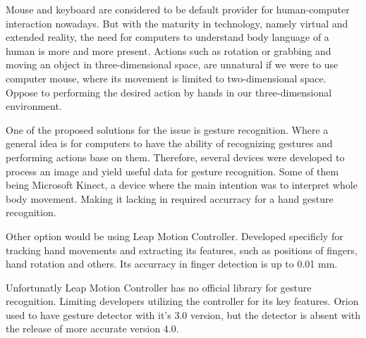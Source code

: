 Mouse and keyboard are considered to be default provider for human-computer interaction nowadays. But with the maturity in technology, namely virtual and extended reality, the need for computers to understand body language of a human is more and more present. Actions such as rotation or grabbing and moving an object in three-dimensional space, are unnatural if we were to use computer mouse, where its movement is limited to two-dimensional space. Oppose to performing the desired action by hands in our three-dimensional environment.

One of the proposed solutions for the issue is gesture recognition. Where a general idea is for computers to have the ability of recognizing gestures and performing actions base on them. Therefore, several devices were developed to process an image and yield useful data for gesture recognition. Some of them being Microsoft Kinect, a device where the main intention was to interpret whole body movement. Making it lacking in required accurracy for a hand gesture recognition. 

Other option would be using Leap Motion Controller. Developed specificly for tracking hand movements and extracting its features, such as positions of fingers, hand rotation and others. Its accurracy in finger detection is up to 0.01 mm.

Unfortunatly Leap Motion Controller has no official library for gesture recognition. Limiting developers utilizing the controller for its key features. Orion used to have gesture detector with it's 3.0 version, but the detector is absent with the release of more accurate version 4.0.